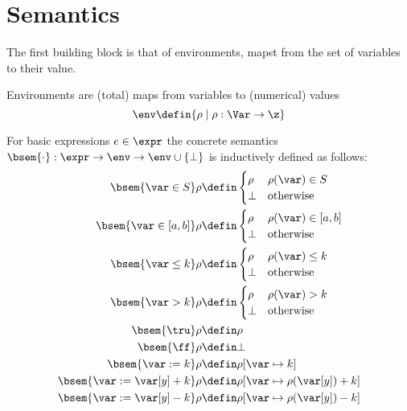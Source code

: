 \section{Semantics}

The first building block is that of environments, mapst from the set
of variables to their value.

\begin{definition}[Environments]
  Environments are (total) maps from variables to (numerical)
  values \[\env \defin \{\rho \mid \rho : \Var \to \z\}\]
\end{definition}

\begin{definition}
  For basic expressions \(e \in \expr\) the concrete semantics \(\bsem{
    \cdot} : \expr \to \env \to \env \cup \{\bot\}\) is inductively
  defined as follows:
  \begin{align*}
    \bsem{\var\in S} \rho & \defin \begin{cases} \rho & \rho(\var)\in S \\ \bot & \text{otherwise} \end{cases} \\
    \bsem{\var\in [a,b]} \rho & \defin \begin{cases} \rho & \rho(\var)\in [a,b] \\ \bot & \text{otherwise} \end{cases} \\
    \bsem{\var\leq k} \rho & \defin \begin{cases} \rho & \rho(\var)\leq k \\ \bot & \text{otherwise} \end{cases} \\
    \bsem{\var> k} \rho & \defin \begin{cases} \rho & \rho(\var) > k \\ \bot & \text{otherwise} \end{cases} \\
    \bsem{\tru} \rho & \defin \rho \\
    \bsem{\ff} \rho & \defin \bot \\
    \bsem{\var:= k} \rho & \defin \rho [\var\mapsto k] \\
    \bsem{\var:= \var[y] + k} \rho & \defin \rho [\var\mapsto \rho(\var[y]) + k] \\
    \bsem{\var:= \var[y] - k} \rho & \defin \rho [\var\mapsto \rho(\var[y]) - k] \\
  \end{align*}
\end{definition}

